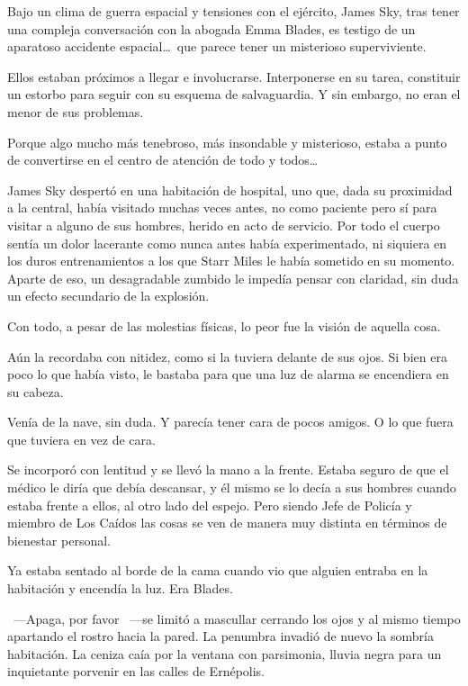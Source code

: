 \begin{prev}
    Bajo un clima de guerra espacial y tensiones con el ejército, James Sky, tras tener una compleja conversación con la abogada Emma Blades, es testigo de un aparatoso accidente espacial\dots\ que parece tener un misterioso superviviente.
\end{prev}

\noindent
Ellos estaban próximos a llegar e involucrarse. Interponerse en su tarea, constituir un estorbo para seguir con su esquema de salvaguardia. Y sin embargo, no eran el menor de sus problemas.

Porque algo mucho más tenebroso, más insondable y misterioso, estaba a punto de convertirse en el centro de atención de todo y todos\dots

\bigskip\noindent
James Sky despertó en una habitación de hospital, uno que, dada su proximidad a la central, había visitado muchas veces antes, no como paciente pero sí para visitar a alguno de sus hombres, herido en acto de servicio. Por todo el cuerpo sentía un dolor lacerante como nunca antes había experimentado, ni siquiera en los duros entrenamientos a los que Starr Miles le había sometido en su momento. Aparte de eso, un desagradable zumbido le impedía pensar con claridad, sin duda un efecto secundario de la explosión.

Con todo, a pesar de las molestias físicas, lo peor fue la visión de aquella cosa.

Aún la recordaba con nitidez, como si la tuviera delante de sus ojos. Si bien era poco lo que había visto, le bastaba para que una luz de alarma se encendiera en su cabeza.

Venía de la nave, sin duda. Y parecía tener cara de pocos amigos. O lo que fuera que tuviera en vez de cara.

Se incorporó con lentitud y se llevó la mano a la frente. Estaba seguro de que el médico le diría que debía descansar, y él mismo se lo decía a sus hombres cuando estaba frente a ellos, al otro lado del espejo. Pero siendo Jefe de Policía y miembro de Los Caídos las cosas se ven de manera muy distinta en términos de bienestar personal.

Ya estaba sentado al borde de la cama cuando vio que alguien entraba en la habitación y encendía la luz. Era Blades.

~---Apaga, por favor ~---se limitó a mascullar cerrando los ojos y al mismo tiempo apartando el rostro hacia la pared. La penumbra invadió de nuevo la sombría habitación. La ceniza caía por la ventana con parsimonia, lluvia negra para un inquietante porvenir en las calles de Ernépolis.

